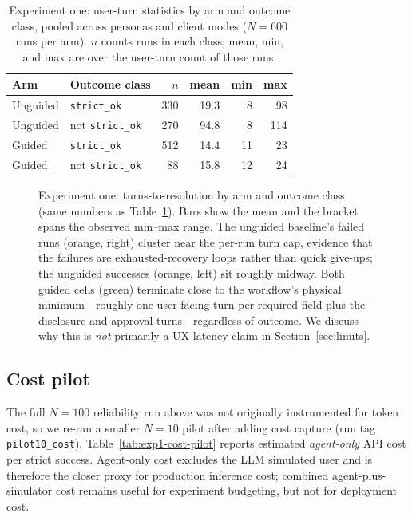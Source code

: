 \documentclass[11pt,a4paper]{article}
\newcommand{\rerunPlaceholderN}{100}
\begin{document}
\begin{table}[htbp]
  \centering
  \caption{Experiment one: user-turn statistics by arm and outcome class, pooled across personas and client modes ($N=600$ runs per arm). $n$ counts runs in each class; mean, min, and max are over the user-turn count of those runs.}
  \label{tab:turns}
  \begin{tabular}{llrrrr}
    \toprule
    Arm & Outcome class & $n$ & mean & min & max \\
    \midrule
    Unguided & \texttt{strict\_ok}                & 330 & 19.3 &  8 &  98 \\
    Unguided & not \texttt{strict\_ok}            & 270 & 94.8 &  8 & 114 \\
    Guided   & \texttt{strict\_ok}                & 512 & 14.4 & 11 &  23 \\
    Guided   & not \texttt{strict\_ok}            &  88 & 15.8 & 12 &  24 \\
    \bottomrule
  \end{tabular}
\end{table}

\begin{figure}[htbp]
  \centering
  
  \caption{Experiment one: turns-to-resolution by arm and outcome class
  (same numbers as Table~\ref{tab:turns}). Bars show the mean and the
  bracket spans the observed min--max range. The unguided baseline's
  failed runs (orange, right) cluster near the per-run turn cap, evidence
  that the failures are exhausted-recovery loops rather than quick
  give-ups; the unguided successes (orange, left) sit roughly midway. Both
  guided cells (green) terminate close to the workflow's physical
  minimum---roughly one user-facing turn per required field plus the
  disclosure and approval turns---regardless of outcome. We discuss why
  this is \emph{not} primarily a UX-latency claim in
  Section~\ref{sec:limits}.}
  \label{fig:chart-exp1-turns}
\end{figure}

\subsection{Cost pilot}

The full $N=\rerunPlaceholderN$ reliability run above was not originally instrumented for token cost, so we re-ran a smaller $N=10$ pilot after adding cost capture (run tag \texttt{pilot10\_cost}). Table~\ref{tab:exp1-cost-pilot} reports estimated \emph{agent-only} API cost per strict success. Agent-only cost excludes the LLM simulated user and is therefore the closer proxy for production inference cost; combined agent-plus-simulator cost remains useful for experiment budgeting, but not for deployment cost.
\end{document}

